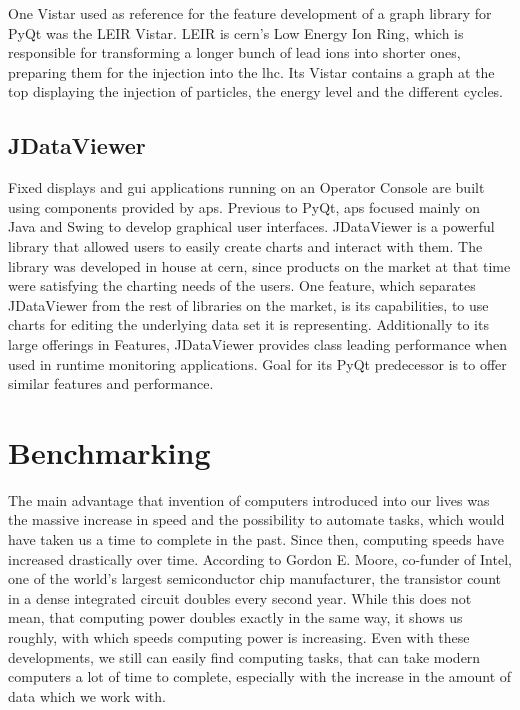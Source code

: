 One Vistar used as reference for the feature development of a graph library for
PyQt was the LEIR Vistar. LEIR is \gls{cern}'s Low Energy Ion Ring, which is
responsible for transforming a longer bunch of lead ions into shorter ones,
preparing them for the injection into the \gls{lhc}. Its Vistar contains a graph
at the top displaying the injection of particles, the energy level and the
different cycles.
\cite{Leir}





\subsection{JDataViewer}
\label{sec:fundamentals:cerncharting:jdataviewer}

Fixed displays and \gls{gui} applications running on an Operator Console are
built using components provided by \gls{aps}. Previous to PyQt, \gls{aps}
focused mainly on Java and Swing to develop graphical user interfaces.
JDataViewer is a powerful library that allowed users to easily create charts and
interact with them. The library was developed in house at \gls{cern}, since
products on the market at that time were satisfying the charting needs of the
users. One feature, which separates JDataViewer from the rest of libraries on
the market, is its capabilities, to use charts for editing the underlying data
set it is representing. Additionally to its large offerings in Features,
JDataViewer provides class leading performance when used in runtime monitoring
applications. Goal for its PyQt predecessor is to offer similar features and
performance.
\cite{JDataViewer}



\section{Benchmarking}
\label{sec:fundamentals:benchmarking}

The main advantage that invention of computers introduced into our lives was the
massive increase in speed and the possibility to automate tasks, which would
have taken us a time to complete in the past. Since then, computing speeds have
increased drastically over time. According to Gordon E. Moore, co-funder of
Intel, one of the world's largest semiconductor chip manufacturer, the
transistor count in a dense integrated circuit doubles every second year. While
this does not mean, that computing power doubles exactly in the same way, it
shows us roughly, with which speeds computing power is increasing. Even with
these developments, we still can easily find computing tasks, that can take
modern computers a lot of time to complete, especially with the increase in the
amount of data which we work with.

